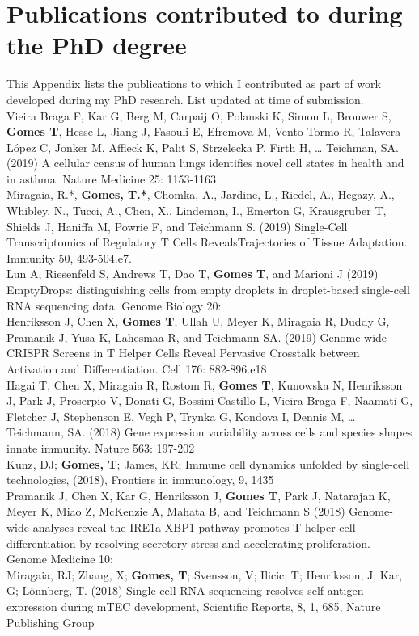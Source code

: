 
\chapter{Publications contributed to during the PhD degree}
\label{appendix:pubs}
This Appendix lists the publications to which I contributed as part of work developed during my PhD research. List updated at time of submission.\\[2\baselineskip]
Vieira Braga F, Kar G, Berg M, Carpaij O, Polanski K, Simon L, Brouwer S, \textbf{Gomes T}, Hesse L, Jiang J, Fasouli E, Efremova M, Vento-Tormo R, Talavera-López C, Jonker M, Affleck K, Palit S, Strzelecka P, Firth H, … Teichman, SA. (2019) A cellular census of human lungs identifies novel cell states in health and in asthma. Nature Medicine 25: 1153-1163\\[1\baselineskip]
Miragaia, R.*, \textbf{Gomes, T.*}, Chomka, A., Jardine, L., Riedel, A., Hegazy, A., Whibley, N., Tucci, A., Chen, X., Lindeman, I., Emerton G, Krausgruber T, Shields J, Haniffa M, Powrie F, and Teichmann S. (2019) Single-Cell Transcriptomics of Regulatory T Cells RevealsTrajectories of Tissue Adaptation. Immunity 50, 493-504.e7.\\[1\baselineskip]
Lun A, Riesenfeld S, Andrews T, Dao T, \textbf{Gomes T}, and Marioni J (2019) EmptyDrops: distinguishing cells from empty droplets in droplet-based single-cell RNA sequencing data. Genome Biology 20:\\[1\baselineskip]
Henriksson J, Chen X, \textbf{Gomes T}, Ullah U, Meyer K, Miragaia R, Duddy G, Pramanik J, Yusa K, Lahesmaa R, and Teichmann SA. (2019) Genome-wide CRISPR Screens in T Helper Cells Reveal Pervasive Crosstalk between Activation and Differentiation. Cell 176: 882-896.e18\\[1\baselineskip]
Hagai T, Chen X, Miragaia R, Rostom R, \textbf{Gomes T}, Kunowska N, Henriksson J, Park J, Proserpio V, Donati G, Bossini-Castillo L, Vieira Braga F, Naamati G, Fletcher J, Stephenson E, Vegh P, Trynka G, Kondova I, Dennis M, … Teichmann, SA. (2018) Gene expression variability across cells and species shapes innate immunity. Nature 563: 197-202\\[1\baselineskip]
Kunz, DJ; \textbf{Gomes, T}; James, KR; Immune cell dynamics unfolded by single-cell technologies, (2018), Frontiers in immunology, 9, 1435\\[1\baselineskip]
Pramanik J, Chen X, Kar G, Henriksson J, \textbf{Gomes T}, Park J, Natarajan K, Meyer K, Miao Z, McKenzie A, Mahata B, and Teichmann S (2018) Genome-wide analyses reveal the IRE1a-XBP1 pathway promotes T helper cell differentiation by resolving secretory stress and accelerating proliferation. Genome Medicine 10:\\[1\baselineskip]
Miragaia, RJ; Zhang, X; \textbf{Gomes, T}; Svensson, V; Ilicic, T; Henriksson, J; Kar, G; Lönnberg, T. (2018) Single-cell RNA-sequencing resolves self-antigen expression during mTEC development, Scientific Reports, 8, 1, 685, Nature Publishing Group

